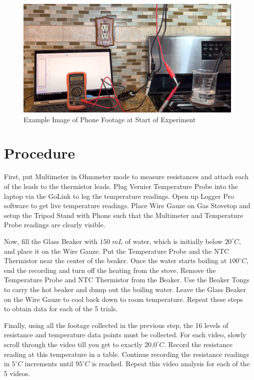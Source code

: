 \begin{figure}[ht]
    \centering
    \includegraphics[width=120mm,height=\textheight,keepaspectratio]{images/setup.png}
    \caption{Example Image of Phone Footage at Start of Experiment}
    \label{fig:footage}
\end{figure}

\section{Procedure}
\label{section:procedure}
First, put Multimeter in Ohmmeter mode to measure resistances and attach each of the leads to the thermistor leads. Plug Vernier Temperature Probe into the laptop via the GoLink to log the temperature readings. Open up Logger Pro software to get live temperature readings. Place Wire Gauze on Gas Stovetop and setup the Tripod Stand with Phone such that the Multimeter and Temperature Probe readings are clearly visible.

Now, fill the Glass Beaker with $150 \; mL$ of water, which is initially below $20^\circ C$, and place it on the Wire Gauze. Put the Temperature Probe and the NTC Thermistor near the center of the beaker. Once the water starts boiling at $100^\circ C$, end the recording and turn off the heating from the stove. Remove the Temperature Probe and NTC Thermistor from the Beaker. Use the Beaker Tongs to carry the hot beaker and dump out the boiling water. Leave the Glass Beaker on the Wire Gauze to cool back down to room temperature. Repeat these steps to obtain data for each of the 5 trials.

Finally, using all the footage collected in the previous step, the 16 levels of resistance and temperature data points must be collected. For each video, slowly scroll through the video till you get to exactly $20.0^\circ C$. Record the resistance reading at this temperature in a table. Continue recording the resistance readings in $5^\circ C$ increments until $95^\circ C$ is reached. Repeat this video analysis for each of the 5 videos.

